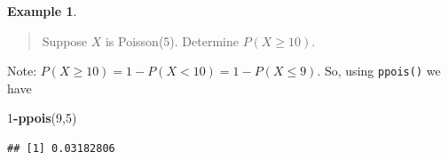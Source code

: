\documentclass[
]{book}
\newenvironment{Shaded}{\begin{snugshade}}{\end{snugshade}}
\newcommand{\DecValTok}[1]{\textcolor[rgb]{0.00,0.00,0.81}{#1}}
\newcommand{\FunctionTok}[1]{\textcolor[rgb]{0.13,0.29,0.53}{\textbf{#1}}}
\newcommand{\NormalTok}[1]{#1}
\newcommand{\SpecialCharTok}[1]{\textcolor[rgb]{0.81,0.36,0.00}{\textbf{#1}}}
\theoremstyle{definition}
\theoremstyle{definition}
\newtheorem{example}{Example}[chapter]
\theoremstyle{definition}
\theoremstyle{definition}
\theoremstyle{remark}
\begin{document}
\begin{example}
\protect\hypertarget{exm:poisson-R}{}\label{exm:poisson-R}\leavevmode

\begin{quote}
Suppose \(X\) is Poisson(5). Determine \(P(X \geq 10)\).
\end{quote}

Note: \(P(X \geq 10) = 1-P(X < 10)= 1-P(X \leq 9)\). So, using \texttt{ppois()} we have

\begin{Shaded}
\begin{Highlighting}[]
\DecValTok{1}\SpecialCharTok{{-}}\FunctionTok{ppois}\NormalTok{(}\DecValTok{9}\NormalTok{,}\DecValTok{5}\NormalTok{)}
\end{Highlighting}
\end{Shaded}

\begin{verbatim}
## [1] 0.03182806
\end{verbatim}

\end{example}
\end{document}
